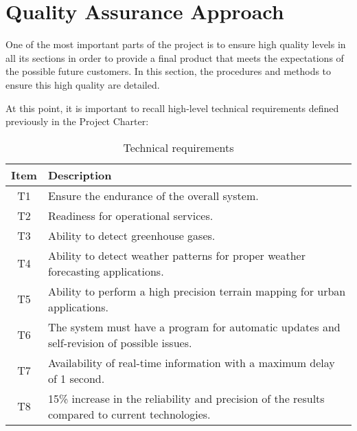 \section{Quality Assurance Approach}
One of the most important parts of the project is to ensure high quality levels in all its sections in order to provide a final product that meets the expectations of the possible future customers. In this section, the procedures and methods to ensure this high quality are detailed. 

At this point, it is important to recall high-level technical requirements defined previously in the Project Charter:
\begin{table}[H]
	\centering
	\begin{tabular}{c p{13.3cm}}
		
		\toprule[2pt]
		
		\textbf{Item} &  \textbf{Description}\\
		
		\midrule [1.5pt]
		
		T1 & Ensure the endurance of the overall system.\vspace{0.2cm}\\
		
		\midrule
		
		T2 & Readiness for operational services.\vspace{0.2cm}\\
		
		\midrule
		
		T3 & Ability to detect greenhouse gases.\vspace{0.2cm}\\
		
		\midrule
		
		T4 & Ability to detect weather patterns for proper weather forecasting applications.\vspace{0.2cm}\\
		
		\midrule
		
		T5 & Ability to perform a high precision terrain mapping for urban applications.\vspace{0.2cm}\\
		
		\midrule
		
		T6 & The system must have a program for automatic updates and self-revision of possible issues.\vspace{0.2cm}\\
		
		\midrule
		
		T7 & Availability of real-time information with a maximum delay of 1 second.\vspace{0.2cm}\\
		
		\midrule
		
		T8 & 15\% increase in the reliability and precision of the results compared to current technologies.\vspace{0.2cm}\\
		
		\bottomrule[2pt]
		
	\end{tabular}
	\caption{Technical requirements}
\end{table}

